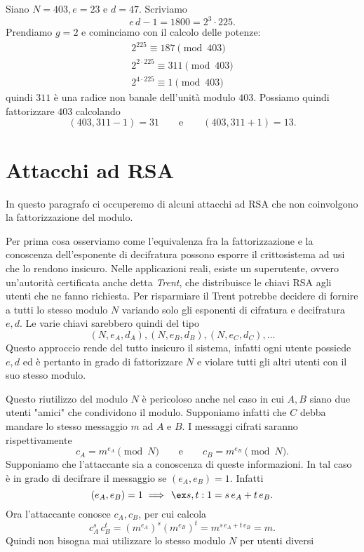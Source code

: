 	\begin{ese}
	Siano \(N=403, e=23\) e \(d=47\). Scriviamo
		\[
		e\,d-1 = 1800 = 2^3 \cdot 225.
		\]
	Prendiamo \(g=2\) e cominciamo con il calcolo delle potenze:
		\begin{gather*}
		2^{225} \equiv 187 \pmod{403}\\
		2^{2\cdot 225} \equiv 311 \pmod{403}\\
		2^{4\cdot 225} \equiv 1 \pmod{403}
		\end{gather*}
	quindi \(311\) è una radice non banale dell'unità modulo \(403\).
	Possiamo quindi fattorizzare \(403\) calcolando
		\[
		(403,311-1) = 31 \qquad\text{e}\qquad (403,311+1) = 13.
		\]
	\end{ese}
\section{Attacchi ad RSA}

	In questo paragrafo ci occuperemo di alcuni attacchi ad RSA che non coinvolgono la fattorizzazione del modulo.

	Per prima cosa osserviamo come l'equivalenza fra la fattorizzazione e la conoscenza dell'esponente di decifratura possono esporre il crittosistema ad usi che lo rendono insicuro.
	Nelle applicazioni reali, esiste un superutente, ovvero un'autorità certificata anche detta \emph{Trent}, che distribuisce le chiavi RSA agli utenti che ne fanno richiesta.
	Per risparmiare il Trent potrebbe decidere di fornire a tutti lo stesso modulo \(N\) variando solo gli esponenti di cifratura e decifratura \(e,d\).
	Le varie chiavi sarebbero quindi del tipo
		\[
		(N,e_A,d_A), (N,e_B,d_B), (N,e_C,d_C), \ldots
		\]
	Questo approccio rende del tutto insicuro il sistema, infatti ogni utente possiede \(e,d\) ed è pertanto in grado di fattorizzare \(N\) e violare tutti gli altri utenti con il suo stesso modulo.

	Questo riutilizzo del modulo \(N\) è pericoloso anche nel caso in cui \(A,B\) siano due utenti "amici" che condividono il modulo.
	Supponiamo infatti che \(C\) debba mandare lo stesso messaggio \(m\) ad \(A\) e \(B\). I messaggi cifrati saranno rispettivamente
		\[
		c_A = m^{e_A} \pmod{N} \qquad\text{e}\qquad c_B = m^{e_B} \pmod{N}.
		\]
	Supponiamo che l'attaccante sia a conoscenza di queste informazioni. In tal caso è in grado di decifrare il messaggio se \((e_A,e_B)=1\). Infatti
		\[
		(e_A, e_B) = 1 \implies \,\ex s,t: 1 = s\,e_A + t\,e_B.
		\]
	Ora l'attaccante conosce \(c_A,c_B\), per cui calcola
		\[
		c_A^s \, c_B^t = (m^{e_A})^s (m^{e_B})^t = m^{s\,e_A+t\,e_B} = m.
		\]
	Quindi non bisogna mai utilizzare lo stesso modulo \(N\) per utenti diversi
